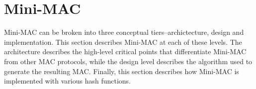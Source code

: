 \section{Mini-MAC}




	

Mini-MAC can be broken into three conceptual tiers--archictecture, design and implementation. This section describes Mini-MAC at each of these levels. The architecture describes the high-level critical points that differentiate Mini-MAC from other MAC protocols, while the design level describes the algorithm used to generate the resulting MAC. Finally, this section describes how Mini-MAC is implemented with various hash functions.


